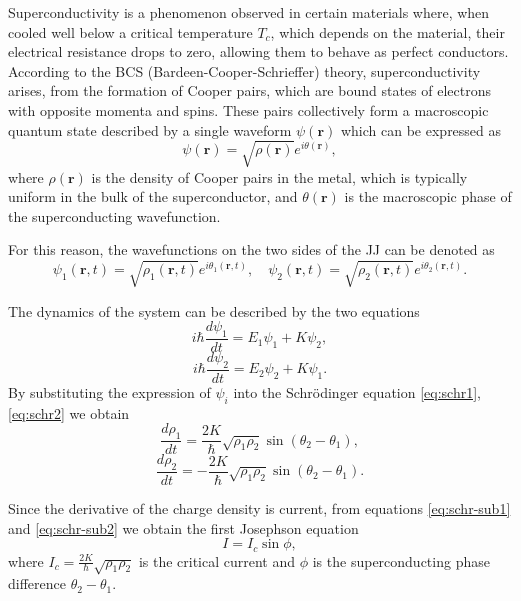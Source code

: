 Superconductivity is a phenomenon observed in certain materials where, when cooled well below a critical temperature $T_c$, which depends on the material, their electrical resistance drops to zero, allowing them to behave as perfect conductors.
According to the BCS (Bardeen-Cooper-Schrieffer) theory, superconductivity arises, from the formation of Cooper pairs, which are bound states of electrons with opposite momenta and spins.
These pairs collectively form a macroscopic quantum state described by a single waveform $\psi(\mathbf{r})$ which can be expressed as 
\begin{equation}\label{eq:BCSequation}
    \psi(\mathbf{r}) = \sqrt{\rho(\mathbf{r})}e^{i\theta(\mathbf{r})},
\end{equation}
where $\rho(\mathbf{r})$ is the density of Cooper pairs in the metal, which is typically uniform in the bulk of the superconductor, and $\theta(\mathbf{r})$ is the macroscopic phase of the superconducting wavefunction.

For this reason, the wavefunctions on the two sides of the JJ can be denoted as
\begin{equation}\label{eq:JosephsonWavefunctions}
    \psi_1(\mathbf{r}, t) = \sqrt{\rho_1(\mathbf{r}, t)} e^{i\theta_1(\mathbf{r},t)}, \quad \psi_2(\mathbf{r}, t) = \sqrt{\rho_2(\mathbf{r}, t)} e^{i\theta_2(\mathbf{r},t)}.
\end{equation}

The dynamics of the system can be described by the two equations\begin{equation}\label{eq:schr1}
    i\hbar \frac{d\psi_1}{dt} = E_1 \psi_1 + K \psi_2,
\end{equation}
\begin{equation}\label{eq:schr2}
    i\hbar \frac{d\psi_2}{dt} = E_2 \psi_2 + K \psi_1.
\end{equation}
By substituting the expression of $\psi_i$ into the Schr\"odinger equation \ref{eq:schr1}, \ref{eq:schr2} we obtain
\begin{equation}\label{eq:schr-sub1}
    \frac{d\rho_1}{dt} = \frac{2K}{\hbar} \sqrt{\rho_1 \rho_2} \sin(\theta_2 - \theta_1),
\end{equation}
\begin{equation}\label{eq:schr-sub2}
    \frac{d\rho_2}{dt} = -\frac{2K}{\hbar} \sqrt{\rho_1 \rho_2} \sin(\theta_2 - \theta_1).
\end{equation}

Since the derivative of the charge density is current, from equations \ref{eq:schr-sub1} and \ref{eq:schr-sub2} we obtain the first Josephson equation
\begin{equation}\label{eq:Josephson1}
    I=I_c\sin{\phi},
\end{equation} 
where $I_c = \frac{2K}{\hbar}\sqrt{\rho_1\rho_2}$ is the critical current and $\phi$ is the superconducting phase difference $\theta_2 - \theta_1$.


